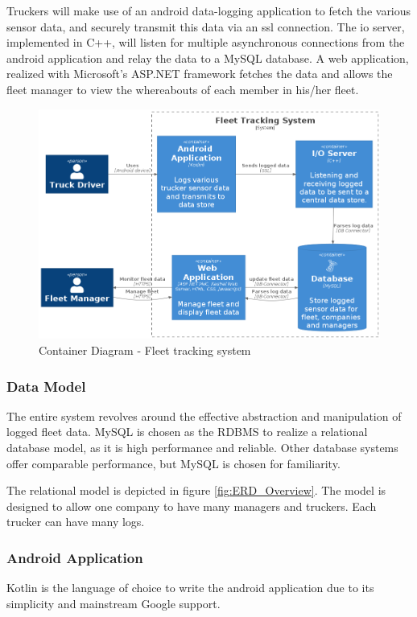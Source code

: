 Truckers will make use of an android data-logging application to fetch the various sensor data, and securely transmit this data via an \ac{ssl} connection.
The \ac{io} server, implemented in C++, will listen for multiple asynchronous connections from the android application and relay the data to a MySQL database.
A web application, realized with Microsoft's ASP.NET framework fetches the data and allows the fleet manager to view the whereabouts of each member in his/her fleet.
\begin{figure}[H]
\centering
\includegraphics[width=6in]{../diag/container.png}
\caption{Container Diagram - Fleet tracking system}
\label{fig:container}
\end{figure}

\subsubsection{Data Model}
The entire system revolves around the effective abstraction and manipulation of logged fleet data.
MySQL is chosen as the RDBMS to realize a relational database model, as it is high performance and reliable.
Other database systems offer comparable performance, but MySQL is chosen for familiarity.

The relational model is depicted in figure \ref{fig:ERD_Overview}.
The model is designed to allow one company to have many managers and truckers. Each trucker can have many logs.

\subsubsection{Android Application}
Kotlin is the language of choice to write the android application due to its simplicity and mainstream Google support.


